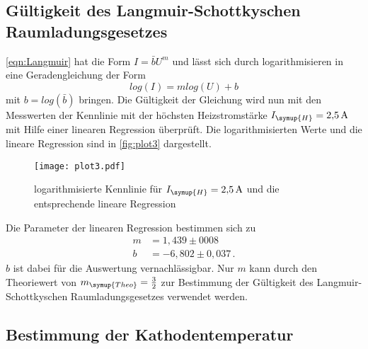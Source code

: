 \subsection{Gültigkeit des Langmuir-Schottkyschen Raumladungsgesetzes}
\label{sec:Langmuir}
\autoref{eqn:Langmuir} hat die Form $I=\bar{b}U^{m}$ und lässt sich durch logarithmisieren in eine
Geradengleichung der Form
\begin{equation*}
  log(I) = mlog(U)+b
\end{equation*}
mit $b = log(\bar{b})$ bringen. Die Gültigkeit der Gleichung wird nun mit den Messwerten der Kennlinie mit der
höchsten Heizstromstärke $I_{\symup{H}}=\SI{2,5}{\ampere}$ mit Hilfe einer linearen Regression überprüft.
Die logarithmisierten Werte und die lineare Regression sind in \autoref{fig:plot3} dargestellt.
\begin{figure}
  \centering
  \texttt{[image: plot3.pdf]}
  \caption{logarithmisierte Kennlinie für $I_{\symup{H}}=\SI{2,5}{\ampere}$ und die entsprechende lineare
  Regression}
  \label{fig:plot3}
\end{figure}
Die Parameter der linearen Regression bestimmen sich zu
\begin{align*}
  m &= 1,439 \pm 0008 \\
  b &= -6,802 \pm 0,037\,.
\end{align*}
$b$ ist dabei für die Auswertung vernachlässigbar. Nur $m$ kann durch den Theoriewert von $m_{\symup{Theo}}=
\frac{3}{2}$ zur Bestimmung der Gültigkeit des Langmuir-Schottkyschen Raumladungsgesetzes verwendet werden.

\subsection{Bestimmung der Kathodentemperatur}
\label{sec:kathodetemp}
